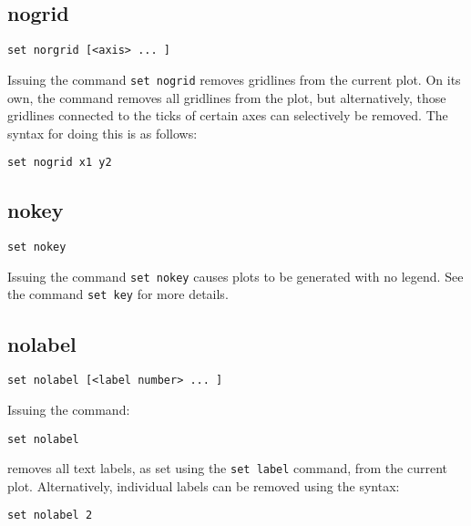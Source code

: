 \documentclass[a4paper,onecolumn,11pt]{book}
\begin{document}
\subsection{nogrid}

\begin{verbatim}
set norgrid [<axis> ... ]
\end{verbatim}

Issuing the command {\tt set nogrid} removes gridlines from the current plot. On
its own, the command removes all gridlines from the plot, but alternatively,
those gridlines connected to the ticks of certain axes can selectively be
removed.  The syntax for doing this is as follows:

\begin{verbatim}
set nogrid x1 y2
\end{verbatim}


\subsection{nokey}

\begin{verbatim}
set nokey
\end{verbatim}

Issuing the command {\tt set nokey} causes plots to be generated with no legend.
See the command {\tt set key} for more details.


\subsection{nolabel}

\begin{verbatim}
set nolabel [<label number> ... ]
\end{verbatim}

Issuing the command:

\begin{verbatim}
set nolabel
\end{verbatim}

\noindent removes all text labels, as set using the {\tt set label} command,
from the current plot. Alternatively, individual labels can be removed using
the syntax:

\begin{verbatim}
set nolabel 2
\end{verbatim}
\end{document}
